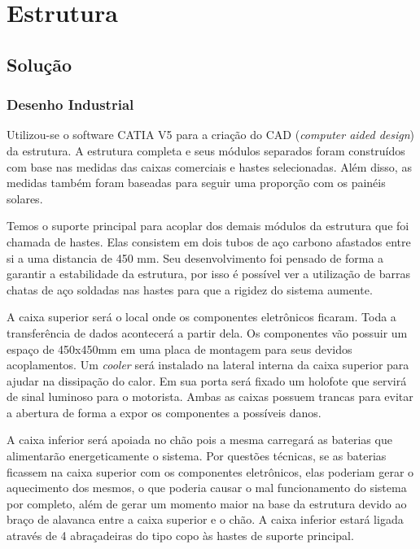 \chapter{Estrutura}

\section{Solução}

\subsection{Desenho Industrial}

Utilizou-se o software CATIA V5 para a criação do CAD (\textit{computer aided design}) da estrutura. A estrutura completa e seus módulos separados foram construídos com base nas medidas das caixas comerciais e hastes selecionadas. Além disso, as medidas também foram baseadas para seguir uma proporção com os painéis solares. 

Temos o suporte principal para acoplar dos demais módulos da estrutura que foi chamada de hastes. Elas consistem em dois tubos de aço carbono afastados entre si a uma distancia de 450 mm. Seu desenvolvimento foi pensado de forma a garantir a estabilidade da estrutura, por isso é possível ver a utilização de barras chatas de aço soldadas nas hastes para que a rigidez do sistema aumente.

A caixa superior será o local onde os componentes eletrônicos ficaram. Toda a transferência de dados acontecerá a partir dela. Os componentes vão possuir um espaço de 450x450mm em uma placa de montagem para seus devidos acoplamentos. Um \textit{cooler} será instalado na lateral interna da caixa superior para ajudar na dissipação do calor. Em sua porta será fixado um holofote que servirá de sinal luminoso para o motorista. Ambas as caixas possuem trancas para evitar a abertura de forma a expor os componentes a possíveis danos. 

A caixa inferior será apoiada no chão pois a mesma carregará as baterias que alimentarão energeticamente o sistema. Por questões técnicas, se as baterias ficassem na caixa superior com os componentes eletrônicos, elas poderiam gerar o aquecimento dos mesmos, o que poderia causar o mal funcionamento do sistema por completo, além de gerar um momento maior na base da estrutura devido ao braço de alavanca entre a caixa superior e o chão. A caixa inferior estará ligada através de 4 abraçadeiras do tipo copo às hastes de suporte principal.

